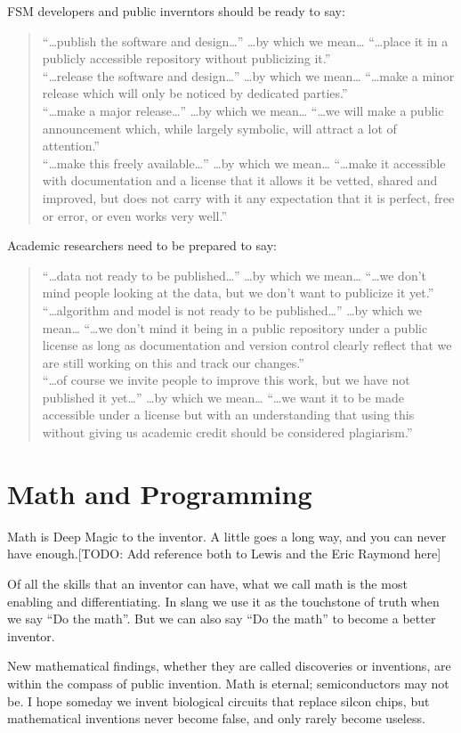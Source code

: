 \documentclass[
	fontsize=10pt, %
	twoside=false, %
	secnumdepth=1, %
]{kaobook}
\begin{document}
FSM developers and public inverntors should be ready to say:
\blockquote{
“…publish the software and design…” …by which we mean… “…place it in a publicly accessible repository without publicizing it.” \\
“…release the software and design…” …by which we mean… “…make a minor release which will only be noticed by dedicated parties.” \\
“…make a major release…” …by which we mean… “…we will make a public announcement which, while largely symbolic, will attract a lot of attention.” \\
“…make this freely available…” …by which we mean… “…make it accessible with documentation and a license that it allows it be vetted, shared and improved, but does not carry with it any expectation that it is perfect, free or error, or even works very well.”
}
Academic researchers need to be prepared to say:
\blockquote{
“…data not ready to be published…” …by which we mean… “…we don’t mind people looking at the data, but we don’t want to publicize it yet.” \\
“…algorithm and model is not ready to be published…” …by which we mean… “…we don’t mind it being in a public repository under a public license as long as documentation and version control clearly reflect that we are still working on this and track our changes.” \\
  “…of course we invite people to improve this work, but we have not published it yet…” …by which we mean… “…we want it to be made accessible under a license but with an understanding that using this without giving us academic credit should be considered plagiarism.” \\
  }

\chapter{Math and Programming}

Math is Deep Magic to the inventor. A little goes a long way,
and you can never have enough.[TODO: Add reference both to Lewis and the Eric Raymond here]

Of all the skills that an inventor can have, what we call math
is the most enabling and differentiating. In slang we use
it as the touchstone of truth when we say ``Do the math''.
But we can also say ``Do the math'' to become a better inventor.

New mathematical findings, whether they are called
discoveries or inventions, are within the compass of public invention.
Math is eternal; semiconductors may not be. I hope someday we invent
biological circuits that replace silcon chips, but mathematical inventions
never become false, and only rarely become useless.
\end{document}
